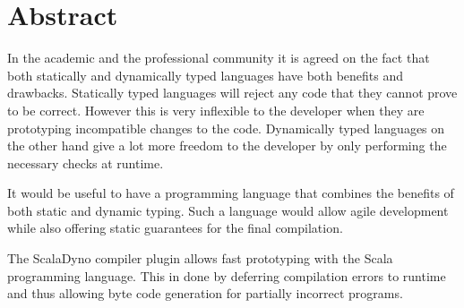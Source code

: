 \section{Abstract}

In the academic and the professional community it is agreed on the fact that both statically and dynamically typed languages have both benefits and drawbacks. Statically typed languages will reject any code that they cannot prove to be correct. However this is very inflexible to the developer when they are prototyping incompatible changes to the code.
Dynamically typed languages on the other hand give a lot more freedom to the developer by only performing the necessary checks at runtime.

It would be useful to have a programming language that combines the benefits of both static and dynamic typing. Such a language would allow agile development while also offering static guarantees for the final compilation.

The ScalaDyno compiler plugin allows fast prototyping with the Scala programming language. This in done by deferring compilation errors to runtime and thus allowing byte code generation for partially incorrect programs.